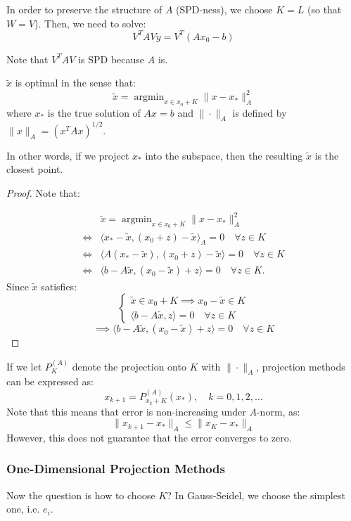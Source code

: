 \documentclass[../main/main.tex]{subfiles}
\begin{document}
In order to preserve the structure of $A$ (SPD-ness), we choose $K=L$ (so that $W=V$). Then, we need to solve: \[
V^{T}AV y = V^{T} (Ax_{0}-b)
\]
\begin{remark}
Note that $V^{T}AV$ is SPD because $A$ is.
\end{remark}
\begin{theorem}
  $\tilde{x}$ is optimal in the sense that: \[
\tilde{x} = \operatorname{argmin}_{x\in x_{0}+K} \|x-x_{*}\|_{A}^2
  \] where $x_{*}$ is the true solution of $Ax=b$ and $\|\cdot \|_{A}$ is defined by $\|x\|_{A} = (x^{T}Ax)^{1 / 2}$.
\end{theorem}

In other words, if we project $x_{*}$ into the subspace, then the resulting $\tilde{x}$ is the closest point.

\begin{proof}
  Note that:

  \begin{align*}
    &\tilde{x} = \operatorname{argmin}_{x\in x_{0}+K} \|x-x_{*}\|_{A}^2 \\
    \iff & \langle x_{*} - \tilde{x}, (x_{0}+z) - \tilde{x} \rangle_{A} = 0 \quad  \forall  z \in K\\
    \iff & \langle A(x_{*}-\tilde{x}), (x_{0}+z)-\tilde{x}\rangle = 0 \quad  \forall  z \in  K\\
    \iff & \langle b-A\tilde{x}, (x_{0}-\tilde{x}) + z\rangle = 0 \quad  \forall  z \in  K
    .\end{align*}
  Since  $\tilde{x}$ satisfies: \[
\begin{cases}
  \tilde{x} \in  x_{0} + K \implies x_{0}-\tilde{x} \in  K \\
  \langle b-A\tilde{x},z\rangle = 0 \quad \forall  z \in  K
\end{cases}
\] \[
 \implies  \langle b-A\tilde{x}, (x_{0}-\tilde{x})+z\rangle = 0 \quad  \forall z \in  K
\]
\end{proof}
If we let $P_{K}^{(A)}$ denote the projection onto $K$ with $\|\cdot \|_{A}$, projection methods can be expressed as: \[
x_{k+1} = P_{x_{k}+K}^{(A)}(x_{*}), \quad  k=0,1,2, \ldots
\]
Note that this means that error is non-increasing under $A$-norm, as: \[
\|x_{k+1}-x_{*}\|_{A}\leq \|x_{K}-x_{*}\|_{A}
\]
However, this does not guarantee that the error converges to zero.

\subsubsection{One-Dimensional Projection Methods}
Now the question is how to choose $K$? In Gauss-Seidel, we choose the simplest one, i.e. $e_{i}$. \\
\end{document}

